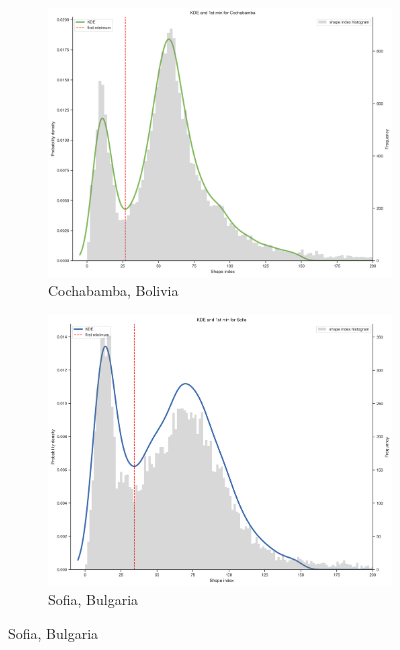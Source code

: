 \begin{figure}
    \centering
    \begin{subfigure}[b]{0.475\textwidth}
        \centering
        \includegraphics[width=\textwidth]{figures/800}
        \caption[]%
        {{\small Cochabamba, Bolivia}}
        \label{fig:kde-cochabamba}
    \end{subfigure}
    \hfill
    \begin{subfigure}[b]{0.475\textwidth}
        \centering
        \includegraphics[width=\textwidth]{figures/15}
        \caption[]%
        {{\small Sofia, Bulgaria}}
        \label{fig:2}
    \end{subfigure}

\end{figure}
